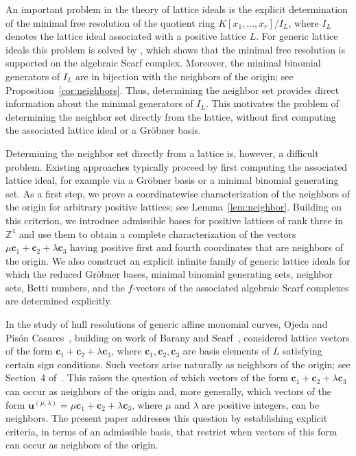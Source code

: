 \documentclass[12pt,a4paper]{amsart}
\theoremstyle{definition}
\begin{document}
An important problem in the theory of lattice ideals is the explicit
determination of the minimal free resolution of the quotient ring
$K[x_1,\ldots,x_r]/I_L$,
where $I_L$ denotes the lattice ideal associated with a positive
lattice $L$. For generic lattice ideals this problem is solved by
\cite[Theorem~4.2]{PS}, which shows that the minimal free resolution is
supported on the algebraic Scarf complex. Moreover, the minimal binomial generators of $I_L$ are in bijection with the neighbors of the origin; see Proposition~\ref{cor:neighbors}. Thus, determining the neighbor set provides direct information about the minimal generators
of $I_L$. This motivates the problem of determining the neighbor set
directly from the lattice, without first computing the associated
lattice ideal or a Gr\"obner basis.

Determining the neighbor set directly from a lattice is, however, a
difficult problem. Existing approaches typically proceed by first
computing the associated lattice ideal, for example via a Gr\"obner
basis or a minimal binomial generating set. As a first step, we prove
a coordinatewise characterization of the neighbors of the origin for
arbitrary positive lattices; see Lemma~\ref{lem:neighbor}. Building on
this criterion, we introduce admissible bases for positive lattices of
rank three in $\mathbb Z^4$ and use them to obtain a complete
characterization of the vectors
$
\mu\mathbf c_1+\mathbf c_2+\lambda\mathbf c_3$
having positive first and fourth coordinates that are neighbors of the
origin. We also construct an explicit infinite family of generic
lattice ideals for which the reduced Gr\"obner bases, minimal binomial
generating sets, neighbor sets, Betti numbers, and the $f$-vectors of
the associated algebraic Scarf complexes are determined explicitly.

In the study of hull resolutions of generic affine monomial curves,
Ojeda and Pis\'on Casares~\cite{OP}, building on work of
Barany and Scarf~\cite{BS}, considered lattice vectors of the form
$\mathbf c_1+\mathbf c_2+\lambda\mathbf c_3$, where
$\mathbf c_1,\mathbf c_2,\mathbf c_3$ are basis elements of $L$
satisfying certain sign conditions. Such vectors arise naturally as
neighbors of the origin; see Section~4 of~\cite{OP}. This raises the question of which vectors of the form
$\mathbf c_1+\mathbf c_2+\lambda\mathbf c_3$
can occur as neighbors of the origin and, more generally, which vectors
of the form
$\mathbf u^{(\mu,\lambda)}
=\mu\mathbf c_1+\mathbf c_2+\lambda\mathbf c_3$,
where $\mu$ and $\lambda$ are positive integers, can be neighbors.
The present paper addresses this question by establishing explicit
criteria, in terms of an admissible basis, that restrict when vectors
of this form can occur as neighbors of the origin.
\end{document}
